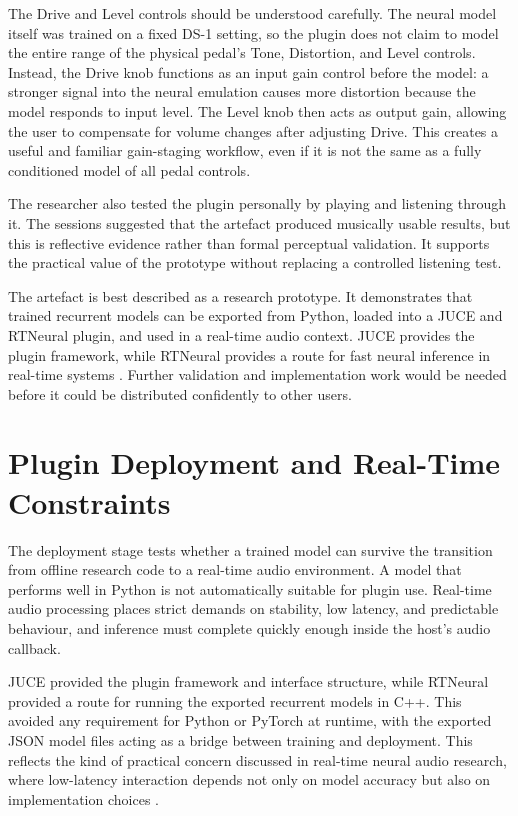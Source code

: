 The Drive and Level controls should be understood carefully. The neural model itself was trained on a fixed DS-1 setting, so the plugin does not claim to model the entire range of the physical pedal's Tone, Distortion, and Level controls. Instead, the Drive knob functions as an input gain control before the model: a stronger signal into the neural emulation causes more distortion because the model responds to input level. The Level knob then acts as output gain, allowing the user to compensate for volume changes after adjusting Drive. This creates a useful and familiar gain-staging workflow, even if it is not the same as a fully conditioned model of all pedal controls.

The researcher also tested the plugin personally by playing and listening through it. The sessions suggested that the artefact produced musically usable results, but this is reflective evidence rather than formal perceptual validation. It supports the practical value of the prototype without replacing a controlled listening test.

The artefact is best described as a research prototype. It demonstrates that trained recurrent models can be exported from Python, loaded into a JUCE and RTNeural plugin, and used in a real-time audio context. JUCE provides the plugin framework, while RTNeural provides a route for fast neural inference in real-time systems \cite{noauthor_juce-frameworkjuce_2026,chowdhury_rtneural_2021}. Further validation and implementation work would be needed before it could be distributed confidently to other users.

\section{Plugin Deployment and Real-Time Constraints}

The deployment stage tests whether a trained model can survive the transition from offline research code to a real-time audio environment. A model that performs well in Python is not automatically suitable for plugin use. Real-time audio processing places strict demands on stability, low latency, and predictable behaviour, and inference must complete quickly enough inside the host's audio callback.

JUCE provided the plugin framework and interface structure, while RTNeural provided a route for running the exported recurrent models in C++. This avoided any requirement for Python or PyTorch at runtime, with the exported JSON model files acting as a bridge between training and deployment. This reflects the kind of practical concern discussed in real-time neural audio research, where low-latency interaction depends not only on model accuracy but also on implementation choices \cite{chowdhury_rtneural_2021,caspe_designing_2025}.


